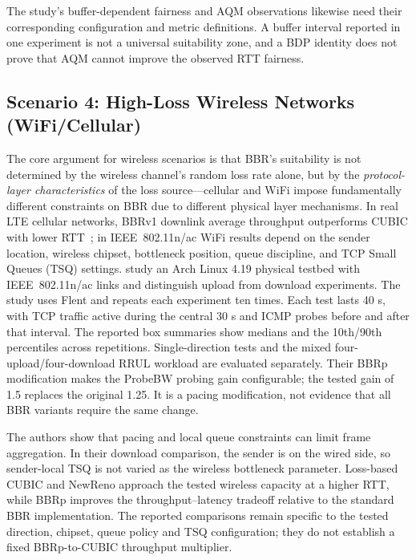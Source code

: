 \documentclass[a4paper,fleqn]{cas-sc}
\begin{document}
The study's buffer-dependent fairness and AQM observations likewise need
their corresponding configuration and metric definitions. A buffer interval
reported in one experiment is not a universal suitability zone, and a BDP
identity does not prove that AQM cannot improve the observed RTT fairness.

\subsection{Scenario 4: High-Loss Wireless Networks (WiFi/Cellular)}
\label{sec:wireless_loss}

The core argument for wireless scenarios is that BBR's suitability is not
determined by the wireless channel's random loss rate alone, but by the
\emph{protocol-layer characteristics} of the loss source---cellular and WiFi
impose fundamentally different constraints on BBR due to different physical layer
mechanisms. In real LTE cellular networks, BBRv1 downlink average throughput
outperforms CUBIC with lower RTT~\citep{atxutegi2018cellular}; in IEEE~802.11n/ac
WiFi results depend on the sender location, wireless chipset, bottleneck
position, queue discipline, and TCP Small Queues (TSQ) settings.
\citet{grazia2020bbrp} study an Arch Linux 4.19 physical testbed with
IEEE~802.11n/ac links and distinguish upload from download experiments.
The study uses Flent and repeats each experiment ten times. Each test
lasts 40 s, with TCP traffic active during the central 30 s and ICMP
probes before and after that interval. The reported box summaries show
medians and the 10th/90th percentiles across repetitions.
Single-direction tests and the mixed four-upload/four-download RRUL
workload are evaluated separately. Their BBRp modification makes the
ProbeBW probing gain configurable;
the tested gain of 1.5 replaces the original 1.25. It is a pacing modification,
not evidence that all BBR variants require the same change.

The authors show that pacing and local queue constraints can limit frame
aggregation. In their download comparison, the sender is on the wired side,
so sender-local TSQ is not varied as the wireless bottleneck parameter.
Loss-based CUBIC and NewReno approach the tested wireless capacity at a
higher RTT, while BBRp improves the throughput--latency tradeoff relative
to the standard BBR implementation. The reported comparisons remain specific to the tested direction, chipset,
queue policy and TSQ configuration; they do not establish a fixed
BBRp-to-CUBIC throughput multiplier.
\end{document}
